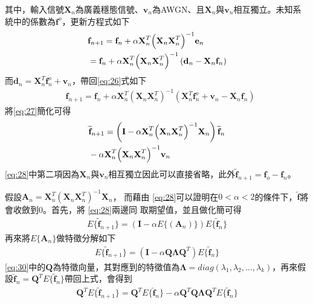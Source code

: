 \documentclass[conference]{IEEEtran}
\begin{document}
    其中，輸入信號$\textbf{X}_n$為廣義穩態信號、$\textbf{v}_n$為AWGN、且$\textbf{X}_n$與$\textbf{v}_n$相互獨立。未知系統中的係數為$\textbf{f}^o$，更新方程式如下
    \begin{align}\label{eq:26}
        & \textbf{f}_{n+1} = \textbf{f}_{n} + \alpha\textbf{X}_{n}^T{\left(\textbf{X}_{n} \textbf{X}_{n}^T\right)}^{-1}\textbf{e}_{n} \notag \\
        & = \textbf{f}_{n} + \alpha\textbf{X}_{n}^T{\left(\textbf{X}_{n} \textbf{X}_{n}^T\right)}^{-1}\left(\textbf{d}_{n} - \textbf{X}_{n}\textbf{f}_{n} \right)
    \end{align}
    而$\textbf{d}_{n} = \textbf{X}_{n}^T\textbf{f}_{n}^{o} + \textbf{v}_{n}$，帶回\eqref{eq:26}式如下
    \begin{align}\label{eq:27}
        & \textbf{f}_{n+1} = \textbf{f}_{n} + \alpha\textbf{X}_{n}^T{\left(\textbf{X}_{n} \textbf{X}_{n}^T\right)}^{-1}\left(\textbf{X}_{n}^T\textbf{f}_{n}^{o} + \textbf{v}_{n} - \textbf{X}_{n}\textbf{f}_{n}  \right)
    \end{align}
    將\eqref{eq:27}簡化可得
    \begin{align}\label{eq:28}
        & \widetilde{\textbf{f}}_{n+1} = \left(\textbf{I} - \alpha\textbf{X}_{n}^T{\left(\textbf{X}_{n} \textbf{X}_{n}^T\right)}^{-1}\textbf{X}_{n} \right) \widetilde{\textbf{f}}_{n} \notag \\
        & - \alpha\textbf{X}_{n}^T{\left(\textbf{X}_{n} \textbf{X}_{n}^T\right)}^{-1}\textbf{v}_{n}
    \end{align}
    \eqref{eq:28}中第二項因為$\textbf{X}_n$與$\textbf{v}_n$相互獨立因此可以直接省略，此外$\widetilde{\textbf{f}}_{n+1} = \textbf{f}_{o} - \textbf{f}_{n}$。
    
    假設$\textbf{A}_{n} = \textbf{X}_{n}^T{\left(\textbf{X}_{n} \textbf{X}_{n}^T\right)}^{-1}\textbf{X}_{n}$，
    而藉由 \eqref{eq:28}可以證明在$0 < \alpha < 2$的條件下，$\widetilde{\textbf{f}}$將會收斂到0。首先，將 \eqref{eq:28}兩邊同
    取期望值，並且做化簡可得
    \begin{align}\label{eq:29}
        E \{ \widetilde{\textbf{f}}_{n+1} \} = \left( \textbf{I} - \alpha E \{\left( \textbf{A}_{n} \right)\}\right) E \{\widetilde{\textbf{f}}_{n}\}
    \end{align}
    再來將$E \{ \textbf{A}_{n} \}$做特徵分解如下
    \begin{align}\label{eq:30}
        E \{ \widetilde{\textbf{f}}_{n+1} \} = \left( \textbf{I} - \alpha \textbf{Q} \boldsymbol{\Lambda} \textbf{Q}^{T}\right) E\{ \widetilde{\textbf{f}}_{n}\}
    \end{align}
    \eqref{eq:30}中的$\textbf{Q}$為特徵向量，其對應到的特徵值為$\boldsymbol{\Lambda} = {diag}\left( {\lambda}_{1}, {\lambda}_{2}, \ldots, {\lambda}_{k}\right)$，再來假設$\widehat{\textbf{f}}_{n} = \textbf{Q}^{T}E\{\widetilde{\textbf{f}}_{n} \}$帶回上式，會得到
    \begin{align}\label{eq:31}
        \textbf{Q}^T E\{ \widetilde{\textbf{f}}_{n+1} \}=\textbf{Q}^TE\{\widehat{\textbf{f}}_{n}\}-\alpha\textbf{Q}^T\textbf{Q}\boldsymbol{\Lambda}\textbf{Q}^TE\{ \widetilde{\textbf{f}}_{n}\}
    \end{align}
    
\end{document}
